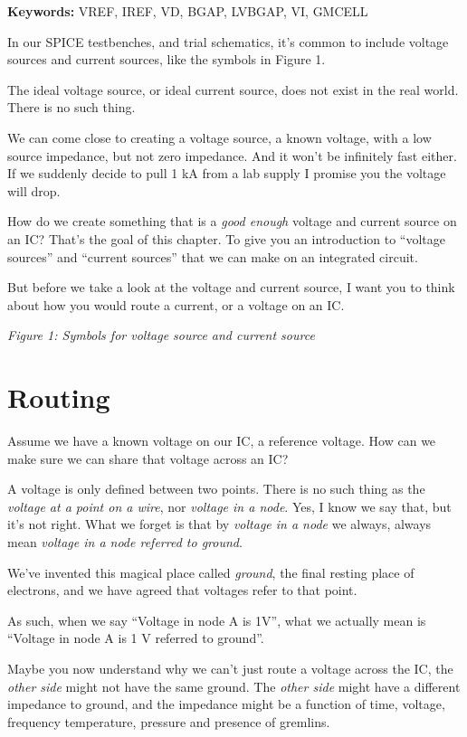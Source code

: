 \textbf{Keywords:} VREF, IREF, VD, BGAP, LVBGAP, VI, GMCELL

In our SPICE testbenches, and trial schematics, it's common to include
voltage sources and current sources, like the symbols in Figure 1.

The ideal voltage source, or ideal current source, does not exist in the
real world. There is no such thing.

We can come close to creating a voltage source, a known voltage, with a
low source impedance, but not zero impedance. And it won't be infinitely
fast either. If we suddenly decide to pull 1 kA from a lab supply I
promise you the voltage will drop.

How do we create something that is a \emph{good enough} voltage and
current source on an IC? That's the goal of this chapter. To give you an
introduction to ``voltage sources'' and ``current sources'' that we can
make on an integrated circuit.

But before we take a look at the voltage and current source, I want you
to think about how you would route a current, or a voltage on an IC.


{
\centering
{}
}

\emph{Figure 1: Symbols for voltage source and current source }

\section{Routing}\label{routing}

Assume we have a known voltage on our IC, a reference voltage. How can
we make sure we can share that voltage across an IC?

A voltage is only defined between two points. There is no such thing as
the \emph{voltage at a point on a wire}, nor \emph{voltage in a node}.
Yes, I know we say that, but it's not right. What we forget is that by
\emph{voltage in a node} we always, always mean \emph{voltage in a node
referred to ground}.

We've invented this magical place called \emph{ground}, the final
resting place of electrons, and we have agreed that voltages refer to
that point.

As such, when we say ``Voltage in node A is 1V'', what we actually mean
is ``Voltage in node A is 1 V referred to ground''.

Maybe you now understand why we can't just route a voltage across the
IC, the \emph{other side} might not have the same ground. The
\emph{other side} might have a different impedance to ground, and the
impedance might be a function of time, voltage, frequency temperature,
pressure and presence of gremlins.

